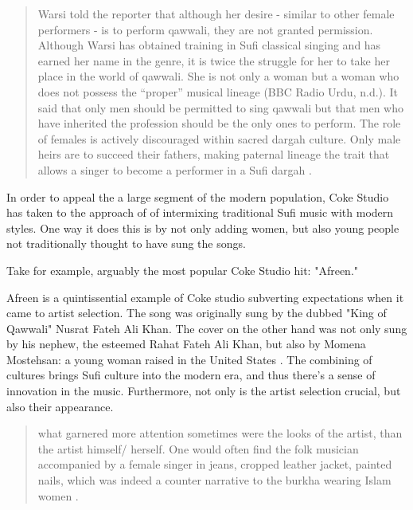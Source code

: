 \documentclass{article}
\begin{document}
  \begin{quote}

    Warsi told the reporter that although her desire - similar to other female
    performers - is to perform qawwali, they are not granted permission.
    Although Warsi has obtained training in Sufi classical singing and has
    earned her name in the genre, it is twice the struggle for her to take her
    place in the world of qawwali. She is not only a woman but a woman who does
    not possess the “proper” musical lineage (BBC Radio Urdu, n.d.).  It said
    that only men should be permitted to sing qawwali but that men who have
    inherited the profession should be the only ones to perform. The role of
    females is actively discouraged within sacred dargah culture. Only male
    heirs are to succeed their fathers, making paternal lineage the trait that
    allows a singer to become a performer in a Sufi dargah
    \autocite{beg2020fizzy}.

  \end{quote}

  In order to appeal the a large segment of the modern population, Coke Studio
  has taken to the approach of of intermixing traditional Sufi music with modern
  styles. One way it does this is by not only adding women, but also young
  people not traditionally thought to have sung the songs. 

  Take for example, arguably the most popular Coke Studio hit: "Afreen."

  Afreen is a quintissential example of Coke studio subverting expectations when
  it came to artist selection. The song was originally sung by the dubbed "King
  of Qawwali" Nusrat Fateh Ali Khan. The cover on the other hand was not only
  sung by his nephew, the esteemed Rahat Fateh Ali Khan, but also by Momena
  Mostehsan: a young woman raised in the United States \autocite{afreen}. The combining of
  cultures brings Sufi culture into the modern era, and thus there's a sense of
  innovation in the music. Furthermore, not only is the artist selection crucial,
  but also their appearance. 

\begin{quote}
  what garnered more attention sometimes were the looks of the artist, than the
  artist himself/ herself. One would often find the folk musician accompanied by a
  female singer in jeans, cropped leather jacket, painted nails, which was indeed
  a counter narrative to the burkha wearing Islam women \autocite{Chibmedium}.
\end{quote}
\end{document}
